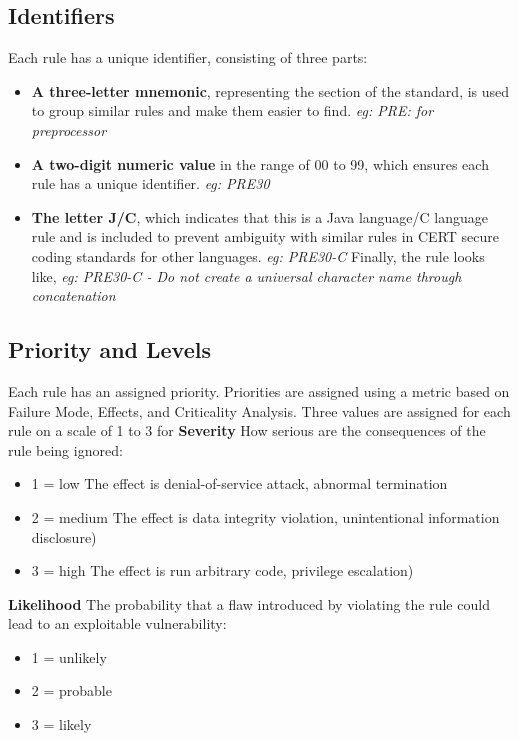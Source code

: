 \subsection{Identifiers}
Each rule has a unique identifier, consisting of three parts:
\begin{itemize}
	\item \textbf{A three-letter mnemonic}, representing the section of the standard, is used to group similar rules and make them easier to find.
	\textit{eg: PRE: for preprocessor}
	\item \textbf{A two-digit numeric value} in the range of 00 to 99, which ensures each rule has a unique identifier.
	\textit{eg: PRE30}
	\item \textbf{The letter J/C}, which indicates that this is a Java language/C language rule and is included to prevent ambiguity with similar rules in CERT secure coding standards for other languages.
	\textit{eg: PRE30-C}
	Finally, the rule looks like,
	\textit{eg: PRE30-C - Do not create a universal character name through concatenation}
\end{itemize}

\subsection{Priority and Levels}
Each rule has an assigned priority. Priorities are assigned using a metric based on Failure
Mode, Effects, and Criticality Analysis. Three values are assigned
for each rule on a scale of 1 to 3 for
\newline
\newline
\textbf{ Severity} How serious are the consequences of the rule being ignored:
\begin{itemize}
\item 1 = low  
The effect is denial-of-service attack, abnormal termination 
\item 2 = medium 
The effect is data integrity violation, unintentional information disclosure)
\item 3 = high 
The effect is run arbitrary code, privilege escalation)
\end{itemize}

\textbf{Likelihood} The probability that a flaw introduced by violating the rule could lead to an exploitable vulnerability:
\begin{itemize}
\item 1 = unlikely
\item 2 = probable
\item 3 = likely
\end{itemize}


